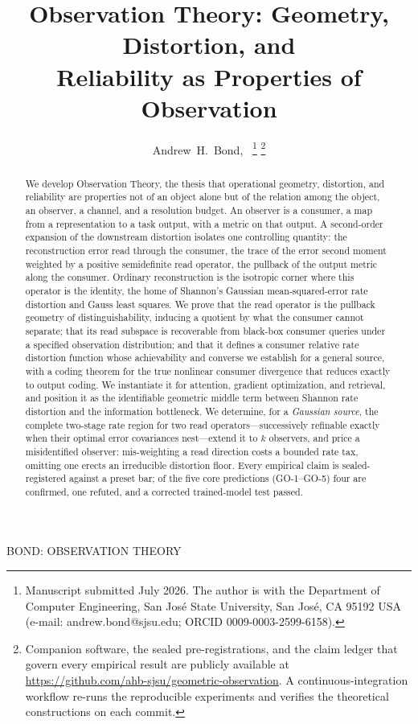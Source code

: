 \documentclass[lettersize,onecolumn]{IEEEtran}
\theoremstyle{definition}
\theoremstyle{remark}
\begin{document}
\title{Observation Theory: Geometry, Distortion, and\\ Reliability as Properties of Observation}

\author{Andrew~H.~Bond,~%
\thanks{Manuscript submitted July 2026. The author is with the Department of
Computer Engineering, San Jos\'e State University, San Jos\'e, CA 95192 USA
(e-mail: andrew.bond@sjsu.edu; ORCID 0009-0003-2599-6158).}%
\thanks{Companion software, the sealed pre-registrations, and the claim ledger that
govern every empirical result are publicly available at
\url{https://github.com/ahb-sjsu/geometric-observation}. A continuous-integration
workflow re-runs the reproducible experiments and verifies the theoretical
constructions on each commit.}}

%
{BOND: OBSERVATION THEORY}

\maketitle

\begin{abstract}
We develop Observation Theory, the thesis that operational geometry, distortion, and
reliability are properties not of an object alone but of the relation among the
object, an observer, a channel, and a resolution budget. An observer is a consumer, a
map from a representation to a task output, with a metric on that output. A
second-order expansion of the downstream distortion isolates one controlling quantity:
the reconstruction error read through the consumer, the trace of the error second
moment weighted by a positive semidefinite read operator, the pullback of the output
metric along the consumer. Ordinary reconstruction is the isotropic corner where this
operator is the identity, the home of Shannon's Gaussian mean-squared-error rate
distortion and Gauss least squares. We prove that the read operator
is the pullback geometry of distinguishability, inducing a quotient by what the
consumer cannot separate; that its read subspace is
recoverable from black-box consumer queries under a specified observation
distribution; and that it defines a
consumer relative rate distortion function whose achievability and converse we
establish for a general source, with a coding theorem for the true nonlinear consumer
divergence that reduces exactly to output coding. We instantiate it for
attention, gradient optimization, and retrieval, and position it as the
identifiable geometric middle term between Shannon rate distortion and the information
bottleneck. We determine, for a \emph{Gaussian source}, the complete two-stage rate region
for two read operators---successively refinable exactly when their optimal error
covariances nest---extend it to $k$ observers, and price a misidentified observer:
mis-weighting a read direction costs a bounded rate tax, omitting one erects an irreducible
distortion floor. Every empirical claim is sealed-registered against a preset bar; of the five core
predictions (GO-1--GO-5) four are confirmed, one refuted, and a corrected trained-model
test passed.
\end{abstract}
\end{document}
